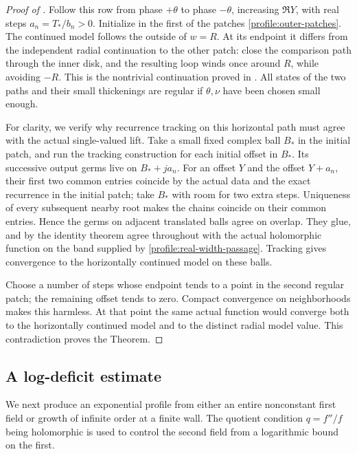 \begin{proof}[Proof of ]
Follow this row from phase \(+\theta\) to phase \(-\theta\),
increasing \(\Re Y\), with real steps
\(a_n=T_*/b_n>0\). Initialize in the first of the patches
\eqref{profile:outer-patches}. The continued model follows the
outside of \(w=R\). At its endpoint it differs from the independent
radial continuation to the other patch: close the comparison path
through the inner disk, and the resulting loop winds once around
\(R\), while avoiding \(-R\). This is the nontrivial continuation
proved in . All states of the two paths
and their small thickenings are regular if \(\theta,\nu\) have
been chosen small enough.

For clarity, we verify why recurrence tracking on this horizontal
path must agree with the actual single-valued lift. Take a small
fixed complex ball \(B_*\) in the initial patch, and run the
tracking construction for each initial offset in \(B_*\). Its
successive output germs live on \(B_*+ja_n\). For an offset \(Y\)
and the offset \(Y+a_n\), their first two common entries coincide
by the actual data and the exact recurrence in the initial patch;
take \(B_*\) with room for two extra steps. Uniqueness of every
subsequent nearby root makes the chains coincide on their common
entries. Hence the germs on adjacent translated balls agree on
overlap. They glue, and by the identity theorem agree throughout
with the actual holomorphic function on the band supplied by
\eqref{profile:real-width-passage}. Tracking gives convergence to
the horizontally continued model on these balls.

Choose a number of steps whose endpoint tends to a point in the
second regular patch; the remaining offset tends to zero. Compact
convergence on neighborhoods makes this harmless. At that point
the same actual function would converge both to the horizontally
continued model and to the distinct radial model value. This
contradiction proves the Theorem.
\end{proof}

\subsection{A log-deficit estimate}

We next produce an exponential profile from either an entire
nonconstant first field or growth of infinite order at a finite
wall. The quotient condition \(q=f''/f\) being holomorphic is used
to control the second field from a logarithmic bound on the first.

